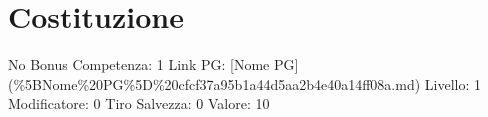 \section{Costituzione}\label{costituzione}

\begin{description}
\tightlist
\item[Tags: STAT]
No Bonus Competenza: 1 Link PG: {[}Nome PG{]}
(\%5BNome\%20PG\%5D\%20cfcf37a95b1a44d5aa2b4e40a14ff08a.md) Livello: 1
Modificatore: 0 Tiro Salvezza: 0 Valore: 10
\end{description}
